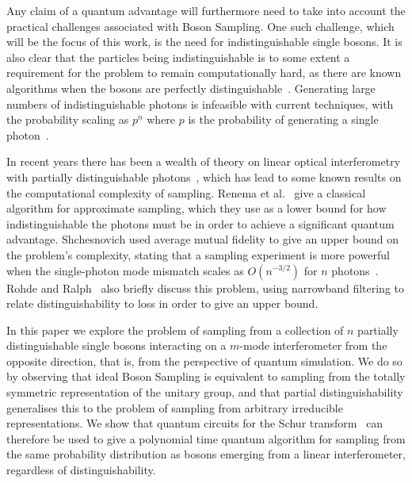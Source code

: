 Any claim of a quantum advantage will furthermore need to take into account the practical challenges associated with Boson Sampling. 
One such challenge, which will be the focus of this work, is the need for indistinguishable single bosons. 
It is also clear that the particles being indistinguishable is to some extent a requirement for the problem to remain computationally hard, as there are known algorithms when the bosons are perfectly distinguishable~\cite{aaronson2014}.
Generating large numbers of indistinguishable photons is infeasible with current techniques, with the probability scaling as $p^n$ where $p$ is the probability of generating a single photon~\cite{gard2015}. 

In recent years there has been a wealth of theory on linear optical interferometry with partially distinguishable photons~\cite{rohde2015, shchesnovich2015, tichy2015, tillmann2015, menssen2017, laibacher2017, spagnolo2014, giordani2018}, which has lead to some known results on the computational complexity of sampling. 
Renema et al.~\cite{renema2017} give a classical algorithm for approximate sampling, which they use as a lower bound for how indistinguishable the photons must be in order to achieve a significant quantum advantage. 
Shchesnovich used average mutual fidelity to give an upper bound on the problem's complexity, stating that a sampling experiment is more powerful when the single-photon mode mismatch scales as $O(n^{-3/2})$ for $n$ photons~\cite{shchesnovich2014}. 
Rohde and Ralph~\cite{rohde2012} also briefly discuss this problem, using narrowband filtering to relate distinguishability to loss in order to give an upper bound.

In this paper we explore the problem of sampling from a collection of $n$ partially distinguishable single bosons interacting on a $m$-mode interferometer from the opposite direction, that is, from the perspective of quantum simulation. 
We do so by observing that ideal Boson Sampling is equivalent to sampling from the totally symmetric representation of the unitary group, and that partial distinguishability generalises this to the problem of sampling from arbitrary irreducible representations.
We show that quantum circuits for the Schur transform~\cite{bacon2007} can therefore be used to give a polynomial time quantum algorithm for sampling from the same probability distribution as bosons emerging from a linear interferometer, regardless of distinguishability.

